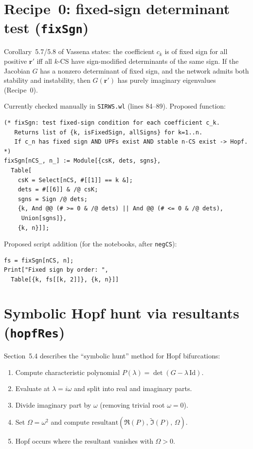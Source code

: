 \documentclass[11pt]{article}
\begin{document}
\section{Recipe~0: fixed-sign determinant test (\texttt{fixSgn})}

Corollary~5.7/5.8 of Vassena states: the coefficient $c_k$ is of fixed sign
for all positive $\mathbf{r}'$ iff all $k$-CS have sign-modified determinants of the
same sign. If the Jacobian $G$ has a nonzero determinant of fixed sign, and the
network admits both stability and instability, then $G(\mathbf{r}')$ has purely
imaginary eigenvalues (Recipe~0).

Currently checked manually in \texttt{SIRWS.wl} (lines 84--89). Proposed
function:
\begin{verbatim}
(* fixSgn: test fixed-sign condition for each coefficient c_k.
   Returns list of {k, isFixedSign, allSigns} for k=1..n.
   If c_n has fixed sign AND UPFs exist AND stable n-CS exist -> Hopf. *)
fixSgn[nCS_, n_] := Module[{csK, dets, sgns},
  Table[
    csK = Select[nCS, #[[1]] == k &];
    dets = #[[6]] & /@ csK;
    sgns = Sign /@ dets;
    {k, And @@ (# >= 0 & /@ dets) || And @@ (# <= 0 & /@ dets),
     Union[sgns]},
    {k, n}]];
\end{verbatim}

Proposed script addition (for the notebooks, after \texttt{negCS}):
\begin{verbatim}
fs = fixSgn[nCS, n];
Print["Fixed sign by order: ",
  Table[{k, fs[[k, 2]]}, {k, n}]]
\end{verbatim}


\section{Symbolic Hopf hunt via resultants (\texttt{hopfRes})}

Section~5.4 describes the ``symbolic hunt'' method for Hopf bifurcations:
\begin{enumerate}[nosep]
  \item Compute characteristic polynomial $P(\lambda) = \det(G - \lambda\,\mathrm{Id})$.
  \item Evaluate at $\lambda = i\omega$ and split into real and imaginary parts.
  \item Divide imaginary part by $\omega$ (removing trivial root $\omega=0$).
  \item Set $\Omega = \omega^2$ and compute $\mathrm{resultant}(\Re(P),\,\tilde\Im(P),\,\Omega)$.
  \item Hopf occurs where the resultant vanishes with $\Omega > 0$.
\end{enumerate}
\end{document}
